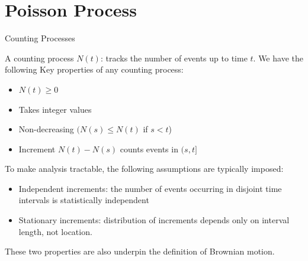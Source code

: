 \documentclass{beamer}
\begin{document}
\section{Poisson Process}
\begin{frame}{Counting Processes}
    \par A counting process \( N(t) \): tracks the number of events up to time \( t \). 
    We have the following Key properties of any counting process:
    \begin{itemize}
        \item \( N(t) \geq 0 \)
        \item Takes integer values
        \item Non-decreasing \( (N(s) \leq N(t) \) if \( s < t \))
        \item Increment \( N(t) - N(s) \) counts events in \( (s, t] \)
    \end{itemize}\pause
    \par To make analysis tractable, the following assumptions are typically imposed:
     \begin{itemize}
        \item Independent increments: the number of events occurring in disjoint time
            intervals is statistically independent
        \item Stationary increments: distribution of increments depends only on interval length, not location.
    \end{itemize}
    \par These two properties are also underpin the definition of Brownian motion.
\end{frame}
\end{document}
